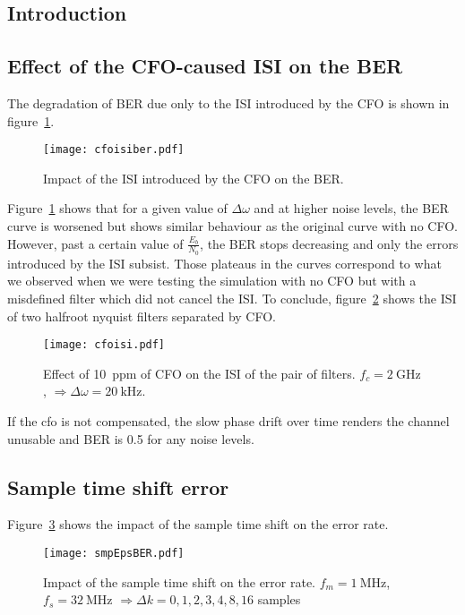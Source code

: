 \subsection{Introduction}

\subsection{Effect of the CFO-caused ISI on the BER}
The degradation of BER due only to the ISI introduced by the CFO is shown in figure~\ref{fig:cfoisiber}.
\begin{figure}[htbp]
\centering
\texttt{[image: cfoisiber.pdf]}
\caption{Impact of the ISI introduced by the CFO on the BER.\label{fig:cfoisiber}}
\end{figure}
Figure~\ref{fig:cfoisiber} shows that for a given value of $\Delta\omega$ and at higher noise levels, the BER curve is worsened but shows similar behaviour as the original curve with no CFO.
However, past a certain value of $\frac{E_b}{N_0}$, the BER stops decreasing and only the errors introduced by the ISI subsist.
Those plateaus in the curves correspond to what we observed when we were testing the simulation with no CFO but with a misdefined filter which did not cancel the ISI.
To conclude, figure~\ref{fig:cfoisi} shows the ISI of two halfroot nyquist filters separated by CFO.
\begin{figure}[htbp]
    \centering
    \texttt{[image: cfoisi.pdf]}
    \caption{Effect of \SI{10}{ppm} of CFO on the ISI of the pair of filters. $f_c = \SI{2}{\giga\hertz}$, $\Rightarrow \Delta\omega = \SI{20}{\kilo\hertz}$.\label{fig:cfoisi}}
\end{figure}

If the cfo is not compensated, the slow phase drift over time renders the channel unusable and BER is 0.5 for any noise levels.

\subsection{Sample time shift error}
Figure~\ref{fig:smpEpsBER} shows the impact of the sample time shift on the error rate.
\begin{figure}[htbp]
\centering
\texttt{[image: smpEpsBER.pdf]}
\caption{Impact of the sample time shift on the error rate. $f_m = \SI{1}{\mega\hertz}$, $f_s = \SI{32}{\mega\hertz}$ $\Rightarrow \Delta k = 0, 1, 2, 3, 4, 8, 16$ samples\label{fig:smpEpsBER}}
\end{figure}


